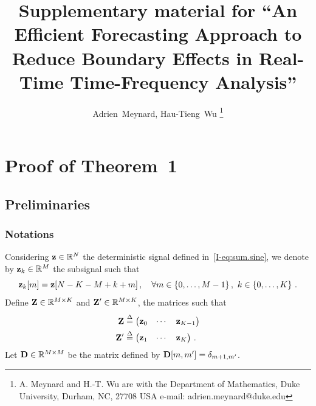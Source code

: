 \documentclass[journal,onecolumn]{IEEEtran}
\title{Supplementary material for ``An Efficient Forecasting Approach to Reduce Boundary Effects in Real-Time Time-Frequency Analysis''}
\author{Adrien~Meynard, %
        Hau-Tieng~Wu
\thanks{A. Meynard and H.-T. Wu are with the Department
of Mathematics, Duke University, Durham,
NC, 27708 USA e-mail: adrien.meynard@duke.edu}}
\begin{document}
\maketitle


\section{Proof of Theorem~1}
\label{ap:th.error}

\subsection{Preliminaries}

\subsubsection{Notations}
Considering ${\mathbf z}\in{\mathbb R}^N$ the deterministic signal defined in~\eqref{I-eq:sum.sine}, we denote by ${\mathbf z}_k\in{\mathbb R}^M$ the subsignal such that
\[
{\mathbf z}_k[m] = {\mathbf z}[N-K-M+k+m]\,,\quad \forall m\in\{0,\ldots,M-1\}\,,\ k\in\{0,\ldots,K\}\ .
\]
Define ${\mathbf Z}\in{\mathbb R}^{M \times K}$ and ${\mathbf Z}'\in{\mathbb R}^{M \times K}$, the matrices such that
\begin{align*}
{\mathbf Z} &\overset{\Delta}{=} \begin{pmatrix}
{\mathbf z}_0 & \cdots & {\mathbf z}_{K-1}
\end{pmatrix}\\ 
{\mathbf Z}' &\overset{\Delta}{=} \begin{pmatrix}
{\mathbf z}_1 & \cdots & {\mathbf z}_{K}
\end{pmatrix}\,.
\end{align*}
Let ${\mathbf D}\in{\mathbb R}^{M\times M}$ be the matrix defined by ${\mathbf D}[m,m']=\delta_{m+1,m'}$.
\end{document}
